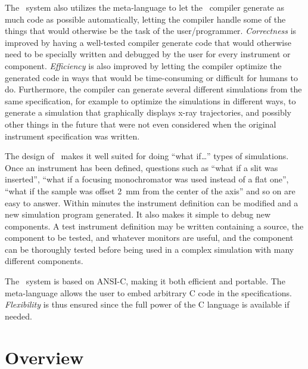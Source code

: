 The \MCX\ system also utilizes the meta-language to let the \MCX\
compiler generate as much code as possible automatically, letting the
compiler handle some of the things that would otherwise be the task of
the user/programmer. \textit{Correctness} is improved by having a well-tested
compiler generate code that would otherwise need to be specially written
and debugged by the user for every instrument or component. \textit{Efficiency}
is also improved by letting the compiler optimize the generated code in
ways that would be time-consuming or difficult for humans to do. Furthermore, the
compiler can generate several different simulations from the same
specification, for example to optimize the simulations in different
ways, to generate a simulation that graphically displays x-ray
trajectories, and possibly other things in the future that were not even
considered when the original instrument specification was written.

The design of \MCX\ makes it well suited for doing ``what if\ldots''
types of simulations. Once an instrument has been defined, questions
such as ``what if a slit was inserted'', ``what if a focusing
monochromator was used instead of a flat one'', ``what if the sample was
offset 2~mm from the center of the axis'' and so on are easy to answer. Within
minutes the instrument definition can be modified and a
new simulation program generated. It also makes it simple to debug new
components. A test instrument definition may be written
containing a source, the component to be tested, and whatever
monitors are useful, and the component can be thoroughly tested before
being used in a complex simulation with many different components.

The \MCX\ system is based on ANSI-C, making it both efficient and
portable. The meta-language allows the user to embed arbitrary C code in
the specifications. \textit{Flexibility} is thus ensured since the full
power of the C language is available if needed.


\section{Overview}

